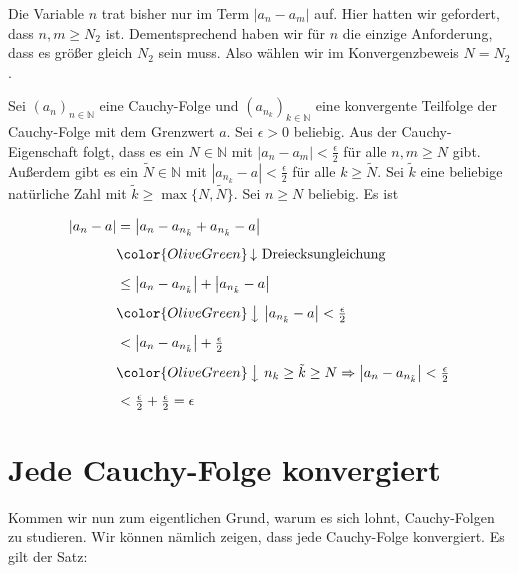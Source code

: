 \documentclass[fontsize=9pt,
               parskip=half-,
               DIV=14,
               listof=chapterentry,
               tocflat]{scrbook}
\begin{document}
\begin{solutionprocess*}
Die Variable $n$ trat bisher nur im Term $|a_{n}-a_{m}|$ auf. Hier hatten wir gefordert, dass $n,m\geq N_{2}$ ist. Dementsprechend haben wir für $n$ die einzige Anforderung, dass es größer gleich $N_{2}$ sein muss. Also wählen wir im Konvergenzbeweis $N=N_{2}$.

\end{solutionprocess*}

\begin{proof*}
Sei $(a_{n})_{n\in \mathbb {N} }$ eine Cauchy-Folge und $\left(a_{n_{k}}\right)_{k\in \mathbb {N} }$ eine konvergente Teilfolge der Cauchy-Folge mit dem Grenzwert $a$. Sei $\epsilon >0$ beliebig. Aus der Cauchy-Eigenschaft folgt, dass es ein $N\in \mathbb {N} $ mit $|a_{n}-a_{m}|<{\tfrac {\epsilon }{2}}$ für alle $n,m\geq N$ gibt. Außerdem gibt es ein ${\tilde {N}}\in \mathbb {N} $ mit $\left|a_{n_{k}}-a\right|<{\tfrac {\epsilon }{2}}$ für alle $k\geq {\tilde {N}}$. Sei ${\tilde {k}}$ eine beliebige natürliche Zahl mit ${\tilde {k}}\geq \max\{N,{\tilde {N}}\}$. Sei $n\geq N$ beliebig. Es ist

\begin{align*}
|a_{n}-a|&=\left|a_{n}-a_{n_{\tilde {k}}}+a_{n_{\tilde {k}}}-a\right|\\[0.5em]&{\color {OliveGreen}\left\downarrow \ {\text{Dreiecksungleichung}}\right.}\\[0.5em]&\leq \left|a_{n}-a_{n_{\tilde {k}}}\right|+\left|a_{n_{\tilde {k}}}-a\right|\\[0.5em]&{\color {OliveGreen}\left\downarrow \ \left|a_{n_{\tilde {k}}}-a\right|<{\tfrac {\epsilon }{2}}\right.}\\[0.5em]&<\left|a_{n}-a_{n_{\tilde {k}}}\right|+{\tfrac {\epsilon }{2}}\\[0.5em]&{\color {OliveGreen}\left\downarrow \ n_{k}\geq {\tilde {k}}\geq N\Rightarrow \left|a_{n}-a_{n_{\tilde {k}}}\right|<{\tfrac {\epsilon }{2}}\right.}\\[0.5em]&<{\tfrac {\epsilon }{2}}+{\tfrac {\epsilon }{2}}=\epsilon 
\end{align*}

\end{proof*}
\clearpage
\section{Jede Cauchy-Folge konvergiert}

Kommen wir nun zum eigentlichen Grund, warum es sich lohnt, Cauchy-Folgen zu studieren. Wir können nämlich zeigen, dass jede Cauchy-Folge konvergiert. Es gilt der Satz:
\end{document}
